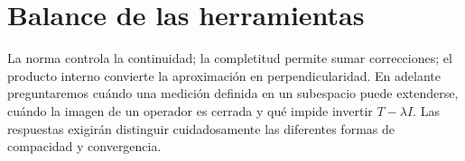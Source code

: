 \section{Balance de las herramientas}
La norma controla la continuidad; la completitud permite sumar correcciones; el producto interno convierte la aproximación en perpendicularidad. En adelante preguntaremos cuándo una medición definida en un subespacio puede extenderse, cuándo la imagen de un operador es cerrada y qué impide invertir $T-\lambda I$. Las respuestas exigirán distinguir cuidadosamente las diferentes formas de compacidad y convergencia.
